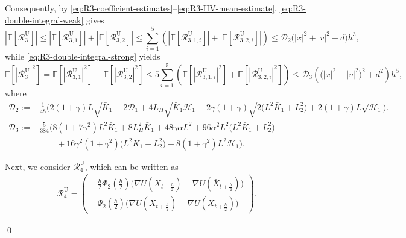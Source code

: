 \documentclass[12pt]{article}
\newenvironment{redtext}
  {\color{black}\ignorespaces}
  {\ignorespacesafterend}
\numberwithin{equation}{section}
\renewenvironment{proof}%
  {\begin{trivlist}%
   \item[]\ignorespaces}%
  {\qed\end{trivlist}}
\newcommand{\E}{\mathbb{E}}
\begin{document}
\begin{redtext}
\begin{proof}
Consequently, by
\eqref{eq:R3-coefficient-estimates}--\eqref{eq:R3-HV-mean-estimate},
\eqref{eq:R3-double-integral-weak} gives
\begin{equation}\label{eq:R3-weak-error-ubu}
|\E[\mathcal R^{\mathrm{U}}_3]|
\leq
|\E[\mathcal R^{\mathrm{U}}_{3,1}]|
+
|\E[\mathcal R^{\mathrm{U}}_{3,2}]|
\leq
\sum_{i=1}^5
\left(
|\E[\mathcal R^{\mathrm{U}}_{3,1,i}]|+|\E[\mathcal R^{\mathrm{U}}_{3,2,i}]|
\right)
\leq
\mathcal D_2
\bigl(|x|^2+|v|^2+d\bigr)h^3,
\end{equation}
while \eqref{eq:R3-double-integral-strong} yields
\begin{equation}
\E[|\mathcal R^{\mathrm{U}}_3|^2]
=
\E[|\mathcal R^{\mathrm{U}}_{3,1}|^2]
+
\E[|\mathcal R^{\mathrm{U}}_{3,2}|^2]
\leq
5\sum_{i=1}^5
\left(
\E[|\mathcal R^{\mathrm{U}}_{3,1,i}|^2]+\E[|\mathcal R^{\mathrm{U}}_{3,2,i}|^2]
\right)
\leq
\mathcal D_3
\left(
\bigl(|x|^2+|v|^2\bigr)^2+d^2
\right)h^5,
\label{eq:R3-strong-error-ubu}
\end{equation}
where
\begin{equation}
\begin{aligned}
\mathcal D_2
:=&
\tfrac{1}{48}\Big(
2(1+\gamma)L\sqrt{\bar K_1}
+2\mathcal D_1
+4L_H\sqrt{\bar K_1\mathscr H_1}
+2\gamma(1+\gamma)
\sqrt{2\bigl(L^2\bar K_1+L_2^2\bigr)}
+2(1+\gamma)L\sqrt{\mathscr H_1}
\Big).
\\
\mathcal D_3
:=&
\tfrac{5}{384}\Big(
8(1+7\gamma^2)L^2\bar K_1
+
8L_H^2\bar K_1
+
48\gamma\alpha L^2
+
96\alpha^2L^2
\bigl(L^2\bar K_1+L_2^2\bigr)
\\
&\quad\quad+
16\gamma^2(1+\gamma^2)
\bigl(L^2\bar K_1+L_2^2\bigr)
+
8(1+\gamma^2)L^2\mathscr H_1
\Big).
\end{aligned}
\end{equation}
\fi

Next, we consider \(\mathcal R^{\mathrm{U}}_4\), which can be written as
\begin{align}
\mathcal R^{\mathrm{U}}_4
=
\left(
\begin{aligned}
&
\tfrac h2
\Phi_2(\tfrac h2)
\Big(
\nabla U(X_{t+\frac h2})
-
\nabla U(\bar X_{t+\frac h2})
\Big)
\\
&
\Psi_2(\tfrac h2)
\Big(
\nabla U(X_{t+\frac h2})
-
\nabla U(\bar X_{t+\frac h2})
\Big)
\end{aligned}
\right).
\label{eq:R4-UBU}
\end{align}


\end{proof}
\end{redtext}
\end{document}
